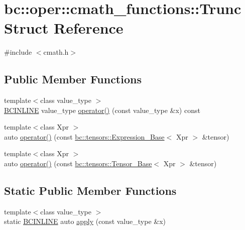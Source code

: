 \hypertarget{structbc_1_1oper_1_1cmath__functions_1_1Trunc}{}\section{bc\+:\+:oper\+:\+:cmath\+\_\+functions\+:\+:Trunc Struct Reference}
\label{structbc_1_1oper_1_1cmath__functions_1_1Trunc}


{\ttfamily \#include $<$cmath.\+h$>$}

\subsection*{Public Member Functions}
\begin{DoxyCompactItemize}
\item 
{\footnotesize template$<$class value\+\_\+type $>$ }\\\hyperlink{common_8h_a6699e8b0449da5c0fafb878e59c1d4b1}{B\+C\+I\+N\+L\+I\+NE} value\+\_\+type \hyperlink{structbc_1_1oper_1_1cmath__functions_1_1Trunc_a6dea236f3d8b1dc77f578efd8f700016}{operator()} (const value\+\_\+type \&x) const
\item 
{\footnotesize template$<$class Xpr $>$ }\\auto \hyperlink{structbc_1_1oper_1_1cmath__functions_1_1Trunc_a791247c7e050f2553ec2c27f6b8b6880}{operator()} (const \hyperlink{classbc_1_1tensors_1_1Expression__Base}{bc\+::tensors\+::\+Expression\+\_\+\+Base}$<$ Xpr $>$ \&tensor)
\item 
{\footnotesize template$<$class Xpr $>$ }\\auto \hyperlink{structbc_1_1oper_1_1cmath__functions_1_1Trunc_a5db48ec44f2480f3e9db37b350b62a8b}{operator()} (const \hyperlink{classbc_1_1tensors_1_1Tensor__Base}{bc\+::tensors\+::\+Tensor\+\_\+\+Base}$<$ Xpr $>$ \&tensor)
\end{DoxyCompactItemize}
\subsection*{Static Public Member Functions}
\begin{DoxyCompactItemize}
\item 
{\footnotesize template$<$class value\+\_\+type $>$ }\\static \hyperlink{common_8h_a6699e8b0449da5c0fafb878e59c1d4b1}{B\+C\+I\+N\+L\+I\+NE} auto \hyperlink{structbc_1_1oper_1_1cmath__functions_1_1Trunc_a4c10911defd4cda3b086b4f03048e59a}{apply} (const value\+\_\+type \&x)
\end{DoxyCompactItemize}


